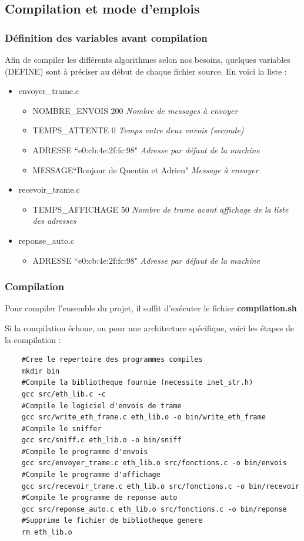 \documentclass[a4paper,11pt]{article}
\begin{document}
	\subsection{Compilation et mode d'emplois}
		\subsubsection{Définition des variables avant compilation}
		Afin de compiler les différents algorithmes selon nos besoins, quelques variables (DEFINE) sont à préciser au début de chaque fichier source. En voici la liste :
		\begin{itemize}
		\item envoyer\_trame.c
			\begin{itemize}
			\item NOMBRE\_ENVOIS 200 \textit{Nombre de messages à envoyer}
			\item TEMPS\_ATTENTE 0    \textit{Temps entre deux envois (seconde)}
			\item ADRESSE ``e0:cb:4e:2f:fc:98" \textit{Adresse par défaut de la machine}
			\item MESSAGE``Bonjour de Quentin et Adrien" \textit{Message à envoyer}
			\end{itemize}
		\item recevoir\_trame.c
			\begin{itemize}
			\item TEMPS\_AFFICHAGE 50 \textit{Nombre de trame avant affichage de la liste des adresses}
			\end{itemize}
		\item reponse\_auto.c
			\begin{itemize}
			\item ADRESSE ``e0:cb:4e:2f:fc:98" \textit{Adresse par défaut de la machine}
			\end{itemize}
		\end{itemize}
		\subsubsection{Compilation}
		Pour compiler l'ensemble du projet, il suffit d'exécuter le fichier \textbf{compilation.sh}
		
		Si la compilation échoue, ou pour une architecture spécifique, voici les étapes de la compilation :
		\lstset{language=bash}
		\begin{lstlisting}
	#Cree le repertoire des programmes compiles
	mkdir bin
	#Compile la bibliotheque fournie (necessite inet_str.h)
	gcc src/eth_lib.c -c
	#Compile le logiciel d'envois de trame
	gcc src/write_eth_frame.c eth_lib.o -o bin/write_eth_frame
	#Compile le sniffer
	gcc src/sniff.c eth_lib.o -o bin/sniff
	#Compile le programme d'envois
	gcc src/envoyer_trame.c eth_lib.o src/fonctions.c -o bin/envois
	#Compile le programme d'affichage
	gcc src/recevoir_trame.c eth_lib.o src/fonctions.c -o bin/recevoir
	#Compile le programme de reponse auto
	gcc src/reponse_auto.c eth_lib.o src/fonctions.c -o bin/reponse
	#Supprime le fichier de bibliotheque genere
	rm eth_lib.o
		\end{lstlisting}
\end{document}
